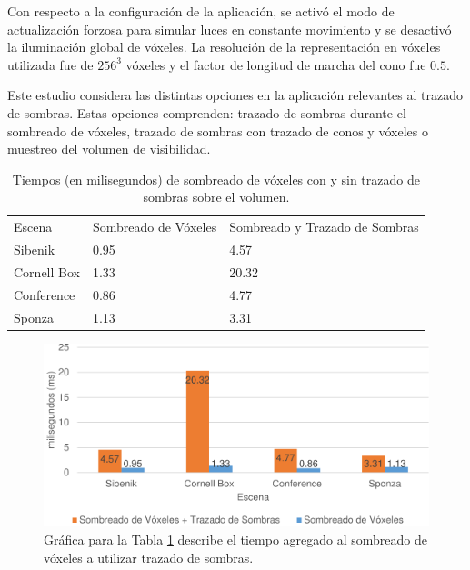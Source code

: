Con respecto a la configuración de la aplicación, se activó el modo de actualización forzosa para simular luces en constante movimiento y se desactivó la iluminación global de vóxeles. La resolución de la representación en vóxeles utilizada fue de $256^3$ vóxeles y el factor de longitud de marcha del cono fue $0.5$.

Este estudio considera las distintas opciones en la aplicación relevantes al trazado de sombras. Estas opciones comprenden: trazado de sombras durante el sombreado de vóxeles, trazado de sombras con trazado de conos y vóxeles o muestreo del volumen de visibilidad.

\begin{table}[h]
\centering
\begin{tabular}{lll}
                                  &                                           &                                                                \\ \hline
\multicolumn{1}{|l|}{Escena}      & \multicolumn{1}{l|}{Sombreado de Vóxeles} & \multicolumn{1}{l|}{Sombreado y Trazado de Sombras} \\ \hline
\multicolumn{1}{|l|}{Sibenik}     & \multicolumn{1}{l|}{0.95}                 & \multicolumn{1}{l|}{4.57}                                      \\
\multicolumn{1}{|l|}{Cornell Box} & \multicolumn{1}{l|}{1.33}                 & \multicolumn{1}{l|}{20.32}                                     \\
\multicolumn{1}{|l|}{Conference}  & \multicolumn{1}{l|}{0.86}                 & \multicolumn{1}{l|}{4.77}                                      \\
\multicolumn{1}{|l|}{Sponza}      & \multicolumn{1}{l|}{1.13}                 & \multicolumn{1}{l|}{3.31}                                      \\ \hline
\end{tabular}
\caption{Tiempos (en milisegundos) de sombreado de vóxeles con y sin trazado de sombras sobre el volumen.}
\label{tab:voxelshading_shadowing}
\end{table}

\begin{figure}[h]
	\centering
	\includegraphics[width=0.95\linewidth]{media/voxelshading_shadow_cropped.pdf}
	\caption{Gráfica para la Tabla \ref{tab:voxelshading_shadowing} describe el tiempo agregado al sombreado de vóxeles a utilizar trazado de sombras.}
	\label{fig:voxelshading_shadowing}
\end{figure}

